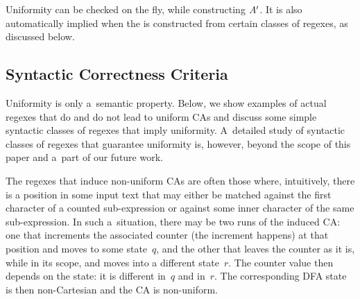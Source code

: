 \documentclass[acmsmall,screen]{acmart}
\begin{document}
Uniformity can be checked on the fly, while constructing $A'$. 
%
It is also automatically implied when the \CA is constructed from certain
classes of regexes, as discussed below.
\cbend

\subsection{Syntactic Correctness Criteria}\label{sec:syntcorrectness}

Uniformity is only a~semantic property.
%
Below, we show examples of actual regexes that do and do not lead to uniform CAs
and discuss some simple syntactic classes of regexes that imply uniformity.
%
A~detailed study of syntactic classes of regexes that guarantee uniformity is,
however, beyond the scope of this paper and a~part of our future work. 

The regexes that induce non-uniform CAs are often those where, intuitively,
there is a position in some input text that may either be matched against the first
character of a counted sub-expression or against some inner character of the
same sub-expression.
In such a~situation, there may be two runs of the induced CA: one that
increments the associated counter (the increment happens) at that position and
moves to some state~$q$, and the other that leaves the counter as it is, while
in its scope, and moves into a different state~$r$. 
The counter value then depends on the state: it is different in~$q$ and in~$r$.
The corresponding DFA state is then non-Cartesian and the CA is non-uniform.
\end{document}
